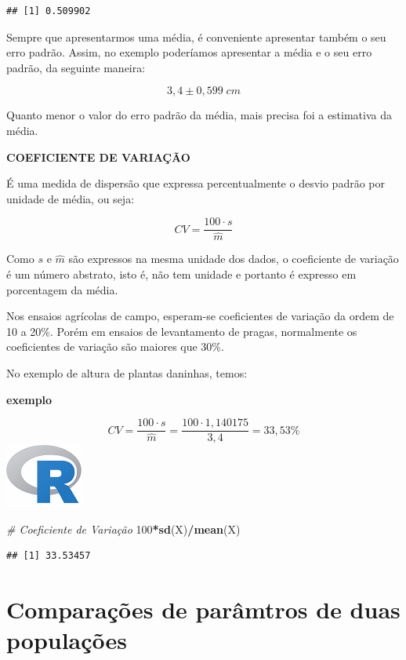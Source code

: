 \documentclass[
]{book}
\newenvironment{Shaded}{\begin{snugshade}}{\end{snugshade}}
\newcommand{\CommentTok}[1]{\textcolor[rgb]{0.56,0.35,0.01}{\textit{#1}}}
\newcommand{\DecValTok}[1]{\textcolor[rgb]{0.00,0.00,0.81}{#1}}
\newcommand{\KeywordTok}[1]{\textcolor[rgb]{0.13,0.29,0.53}{\textbf{#1}}}
\newcommand{\NormalTok}[1]{#1}
\newcommand{\OperatorTok}[1]{\textcolor[rgb]{0.81,0.36,0.00}{\textbf{#1}}}
\begin{document}
\begin{verbatim}
## [1] 0.509902
\end{verbatim}

Sempre que apresentarmos uma média, é conveniente apresentar também o seu erro padrão. Assim, no exemplo poderíamos apresentar a média e o seu erro padrão, da seguinte maneira:

\[
3,4 \pm 0,599\;cm
\]

Quanto menor o valor do erro padrão da média, mais precisa foi a estimativa da média.

\textbf{COEFICIENTE DE VARIAÇÃO}

É uma medida de dispersão que expressa percentualmente o desvio padrão por unidade de média, ou seja:

\[
CV = \frac{100 \cdot s}{\hat{m}}
\]

Como \(s\) e \(\hat{m}\) são expressos na mesma unidade dos dados, o coeficiente de variação é um número abstrato, isto é, não tem unidade e portanto é expresso em porcentagem da média.

Nos ensaios agrícolas de campo, esperam-se coeficientes de variação da ordem de 10 a 20\%. Porém em ensaios de levantamento de pragas, normalmente os coeficientes de variação são maiores que 30\%.

No exemplo de altura de plantas daninhas, temos:

\textbf{exemplo}

\[
CV = \frac{100 \cdot s}{\hat{m}} = \frac{100 \cdot 1,140175}{3,4} = 33,53\%
\]
\includegraphics{R.png}

\begin{Shaded}
\begin{Highlighting}[]
\CommentTok{# Coeficiente de Variação}
\DecValTok{100}\OperatorTok{*}\KeywordTok{sd}\NormalTok{(X)}\OperatorTok{/}\KeywordTok{mean}\NormalTok{(X)}
\end{Highlighting}
\end{Shaded}

\begin{verbatim}
## [1] 33.53457
\end{verbatim}

\hypertarget{comparauxe7uxf5es-de-paruxe2mtros-de-duas-populauxe7uxf5es}{%
\chapter{Comparações de parâmtros de duas populações}\label{comparauxe7uxf5es-de-paruxe2mtros-de-duas-populauxe7uxf5es}}
\end{document}
